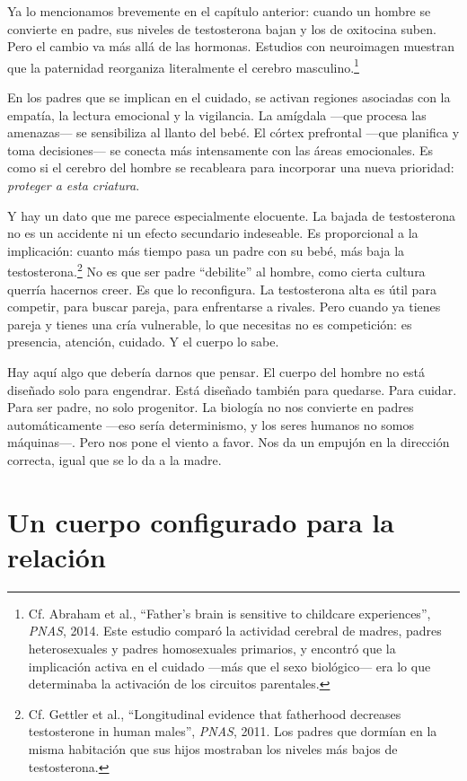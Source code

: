Ya lo mencionamos brevemente en el capítulo anterior: cuando un hombre se convierte en padre, sus niveles de testosterona bajan y los de oxitocina suben. Pero el cambio va más allá de las hormonas. Estudios con neuroimagen muestran que la paternidad reorganiza literalmente el cerebro masculino.\footnote{Cf. Abraham et al., ``Father's brain is sensitive to childcare experiences'', \textit{PNAS}, 2014. Este estudio comparó la actividad cerebral de madres, padres heterosexuales y padres homosexuales primarios, y encontró que la implicación activa en el cuidado ---más que el sexo biológico--- era lo que determinaba la activación de los circuitos parentales.}

En los padres que se implican en el cuidado, se activan regiones asociadas con la empatía, la lectura emocional y la vigilancia. La amígdala ---que procesa las amenazas--- se sensibiliza al llanto del bebé. El córtex prefrontal ---que planifica y toma decisiones--- se conecta más intensamente con las áreas emocionales. Es como si el cerebro del hombre se recableara para incorporar una nueva prioridad: \textit{proteger a esta criatura}.

Y hay un dato que me parece especialmente elocuente. La bajada de testosterona no es un accidente ni un efecto secundario indeseable. Es proporcional a la implicación: cuanto más tiempo pasa un padre con su bebé, más baja la testosterona.\footnote{Cf. Gettler et al., ``Longitudinal evidence that fatherhood decreases testosterone in human males'', \textit{PNAS}, 2011. Los padres que dormían en la misma habitación que sus hijos mostraban los niveles más bajos de testosterona.} No es que ser padre ``debilite'' al hombre, como cierta cultura querría hacernos creer. Es que lo reconfigura. La testosterona alta es útil para competir, para buscar pareja, para enfrentarse a rivales. Pero cuando ya tienes pareja y tienes una cría vulnerable, lo que necesitas no es competición: es presencia, atención, cuidado. Y el cuerpo lo sabe.

Hay aquí algo que debería darnos que pensar. El cuerpo del hombre no está diseñado solo para engendrar. Está diseñado también para quedarse. Para cuidar. Para ser padre, no solo progenitor. La biología no nos convierte en padres automáticamente ---eso sería determinismo, y los seres humanos no somos máquinas---. Pero nos pone el viento a favor. Nos da un empujón en la dirección correcta, igual que se lo da a la madre.

\section{Un cuerpo configurado para la relación}

